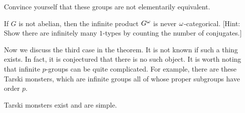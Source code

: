 \documentclass{amsart}
\begin{document}
\begin{exr}
Convince yourself that these groups are not elementarily equivalent.
\end{exr}

\begin{comment}
\begin{sol}
Commute elements.
{1:03}
One element with abelian commutator group.
\end{sol}
\end{comment}

\begin{exr}[*]
If $G$ is not abelian, then the infinite product $G^\omega$ 
is never $\omega$-categorical. [Hint: Show there are infinitely many $1$-types
by counting the number of conjugates.]
\end{exr}

Now we discuss the third case in the theorem.
It is not known if such a thing exists.
In fact, it is conjectured that there is no such object.
It is worth noting that infinite $p$-groups can be quite complicated.
For example, there are these Tarski monsters, which are infinite groups all of whose
proper subgroups have order $p$.

\begin{thm}[Olshanskii]
Tarski monsters exist and are simple.
\end{thm}
\end{document}
